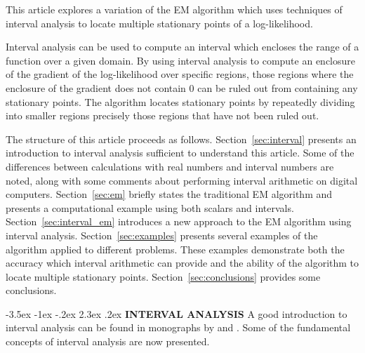 \documentclass[10pt,twoside]{article}
\makeatletter
\renewcommand\section{\@startsection {section}{1}{\z@}%
                 {-3.5ex \@plus -1ex \@minus -.2ex}%
                 {2.3ex \@plus.2ex}%
                 {\normalfont\centering\bfseries }}
\makeatother
\begin{document}
This article explores a variation of the EM algorithm which uses techniques
of interval analysis to locate multiple stationary points of a
log-likelihood.

Interval analysis can be used to compute an interval which encloses the
range
of a function over a given domain.  By using interval analysis to compute an
enclosure of the gradient of the log-likelihood over specific regions, those
regions where the enclosure of the gradient does not contain $0$ can be
ruled
out from containing any stationary points.  The algorithm locates stationary
points by repeatedly dividing into smaller regions precisely those regions
that have not been ruled out.

The structure of this article proceeds as follows.
Section~\ref{sec:interval} presents an introduction to interval 
analysis sufficient to understand this article.  Some of the differences
between
calculations with real numbers and interval numbers are noted, along with
some
comments about performing interval arithmetic on digital computers.
Section~\ref{sec:em}  briefly states the traditional EM algorithm and
presents a computational example using both scalars and intervals.
Section~\ref{sec:interval_em} introduces a new approach to the EM
algorithm
using interval analysis.
Section~\ref{sec:examples} presents several examples of the algorithm 
applied
to different problems.  These examples demonstrate both the accuracy which
interval arithmetic can provide and the ability of the algorithm to locate
multiple stationary points.
Section~\ref{sec:conclusions} provides some conclusions.

\section{\bf INTERVAL ANALYSIS}\label{sec:interval}
A good introduction to interval analysis can be found in monographs by
\cite{HansenBook} and \cite{Moore79}.  Some of the fundamental concepts
of interval analysis are now presented.
\end{document}
